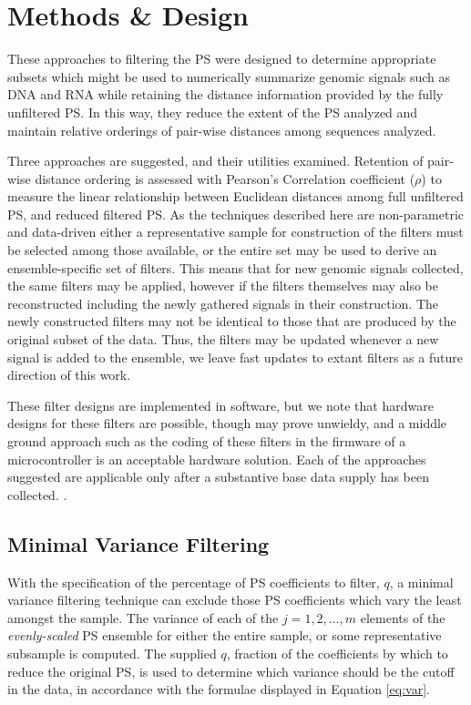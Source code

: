 \documentclass[10pt,conference]{IEEEtran}
\begin{document}
\section{Methods \& Design}
\label{sec:meth}

\noindent These approaches to filtering the PS were designed to determine appropriate subsets which might be used to numerically summarize genomic signals such as DNA and RNA while retaining the 
distance information provided by the fully unfiltered PS. 
In this way, they reduce the extent of the PS analyzed and maintain relative orderings of pair-wise distances among sequences analyzed.  

Three approaches are suggested, and their utilities examined.
Retention of pair-wise distance ordering is assessed with Pearson's Correlation coefficient ($\rho$) to measure the linear relationship between Euclidean distances among full unfiltered PS, and reduced filtered PS. 
As the techniques described here are non-parametric and data-driven either a representative sample 
for construction of the filters must be selected among those available, or the entire set may be used 
to derive an ensemble-specific set of filters. 
This means that for new genomic signals collected, the same filters may be applied, however if the filters themselves may also be reconstructed including the newly 
gathered signals in their construction.
The newly constructed filters may not be identical to those that are produced by the original subset of the data. 
Thus, the filters may be updated whenever a new signal is added to the ensemble, we leave fast updates to extant filters as a future direction of this work. 

These filter designs are implemented in software, but we note that hardware designs for 
these filters are possible, though may prove unwieldy, and a middle ground approach such as the 
coding of these filters in the firmware of a microcontroller is an acceptable hardware solution.  
Each of the approaches suggested are applicable only after a substantive base data supply has been 
collected. 
. 

\subsection{Minimal Variance Filtering} 

\noindent With the specification of the percentage of PS coefficients to filter, $q$, a minimal variance filtering technique can exclude those PS coefficients which vary the least amongst the sample. 
The variance of each of the $j=1,2,\dots,m$ elements of the \textit{evenly-scaled} PS ensemble for either the entire sample, or some representative subsample is computed.
The supplied $q$, fraction of the coefficients by which to reduce the original PS, is used to determine which variance should be the cutoff in the data, in accordance with the formulae displayed in Equation \ref{eq:var}. 
\end{document}
